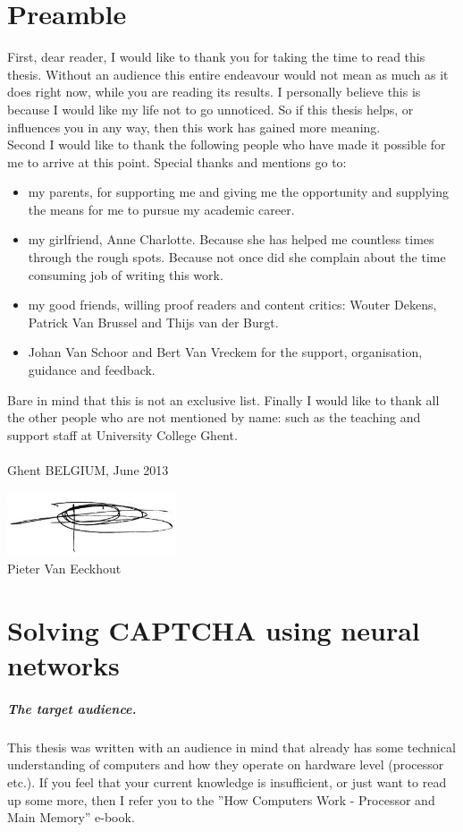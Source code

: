 \documentclass[pdftex,a4paper,12pt,twoside]{report}
\newcommand{\captchasp}{CAPTCHA }
\newcommand{\studenta}{Pieter {Van Eeckhout}}
\newcommand{\titel}{Solving \captchasp using neural networks}
\begin{document}
\chapter*{Preamble}
\label{ch:preamble}
First, dear reader, I would like to thank you for taking the time to read this thesis. Without an audience this entire endeavour would not mean as much as it does right now, while you are reading its results. I personally believe this is because I would like my life not to go unnoticed. So if this thesis helps, or influences you in any way, then this work has gained more meaning.\\Second I would like to thank the following people who have made it possible for me to arrive at this point. Special thanks and mentions go to:
\begin{itemize}
\item my parents, for supporting me and giving me the opportunity and supplying the means for me to pursue my academic career.
\item my girlfriend, Anne Charlotte. Because she has helped me countless times through the rough spots. Because not once did she complain about the time consuming job of writing this work.
\item my good friends, willing proof readers and content critics: Wouter Dekens, Patrick Van Brussel and Thijs van der Burgt.
\item Johan Van Schoor and Bert Van Vreckem for the support, organisation, guidance and feedback.
\end{itemize}
Bare in mind that this is not an exclusive list. Finally I would like to thank all the other people who are not mentioned by name: such as the teaching and support staff at University College Ghent.\\\\Ghent BELGIUM, June 2013
\begin{center}
\includegraphics[width=5cm]{./img/signature.png}\\[.5cm]
\studenta
\end{center}
\chapter{\titel}
\label{ch:introduction}
\paragraph{The target audience.}
This thesis was written with an audience in mind that already has some technical understanding of computers and how they operate on hardware level (processor etc.). If you feel that your current knowledge is insufficient, or just want to read up some more, then I refer you to the ''How Computers Work - Processor and Main Memory'' \citep{Young2001} e-book.
\end{document}
